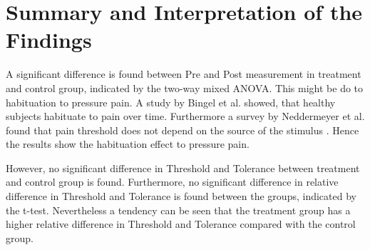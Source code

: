 \section{Summary and Interpretation of the Findings}


A significant difference is found between Pre and Post measurement in treatment and control group, indicated by the two-way mixed ANOVA. This might be do to habituation to pressure pain. A study by Bingel et al. \cite{Bingel2007} showed, that healthy subjects habituate to pain over time.  Furthermore a survey by Neddermeyer et al. \cite{Neddermeyer2007} found that pain threshold does not depend on the source of the stimulus . Hence the results show the habituation effect to pressure pain.

However, no significant difference in Threshold and Tolerance between treatment and control group is found. Furthermore, no significant difference in relative difference in Threshold and Tolerance is found between the groups, indicated by the t-test. Nevertheless a tendency can be seen that the treatment group has a higher relative difference in Threshold and Tolerance compared with the control group. 

